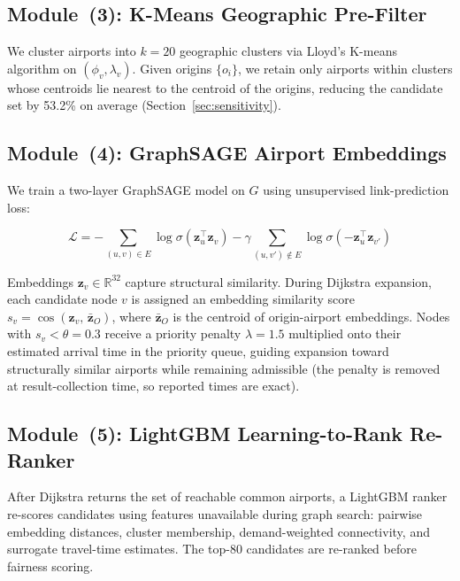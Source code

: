 \documentclass[review]{elsarticle}
\begin{document}
\subsection{Module~(3): K-Means Geographic Pre-Filter}

We cluster airports into $k=20$ geographic clusters via Lloyd's K-means algorithm \cite{lloyd1982} on $(\phi_v, \lambda_v)$.
Given origins $\{o_i\}$, we retain only airports within clusters whose centroids lie nearest to the centroid of the origins, reducing the candidate set by 53.2\% on average (Section~\ref{sec:sensitivity}).

\subsection{Module~(4): GraphSAGE Airport Embeddings}

We train a two-layer GraphSAGE model \cite{hamilton2017} on $G$ using unsupervised link-prediction loss:

\begin{equation}
    \mathcal{L} = -\sum_{(u,v) \in E} \log \sigma(\mathbf{z}_u^\top \mathbf{z}_v) - \gamma \sum_{(u,v') \notin E} \log \sigma(-\mathbf{z}_u^\top \mathbf{z}_{v'})
\end{equation}

Embeddings $\mathbf{z}_v \in \mathbb{R}^{32}$ capture structural similarity.
During Dijkstra expansion, each candidate node $v$ is assigned an embedding similarity score $s_v = \cos(\mathbf{z}_v,\, \bar{\mathbf{z}}_O)$, where $\bar{\mathbf{z}}_O$ is the centroid of origin-airport embeddings.
Nodes with $s_v < \theta = 0.3$ receive a priority penalty $\lambda = 1.5$ multiplied onto their estimated arrival time in the priority queue, guiding expansion toward structurally similar airports while remaining admissible (the penalty is removed at result-collection time, so reported times are exact).

\subsection{Module~(5): LightGBM Learning-to-Rank Re-Ranker}

After Dijkstra returns the set of reachable common airports, a LightGBM ranker \cite{ke2017} re-scores candidates using features unavailable during graph search: pairwise embedding distances, cluster membership, demand-weighted connectivity, and surrogate travel-time estimates.
The top-80 candidates are re-ranked before fairness scoring.
\end{document}
